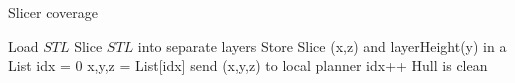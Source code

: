 \begin{algorithm}
	\caption{Slicer coverage} \label{algo:CompCove}
	\begin{small}
	
	
	\begin{algorithmic}[1]
		\State Load $STL$ 
		\State Slice $STL$ into separate layers
		\State Store Slice (x,z) and layerHeight(y) in a List
		\EndFor
		\State idx = 0
		    \State x,y,z = List[idx]
		    \State send (x,y,z) to local planner
		    \State idx++
		\Else
		\State Hull is clean
		\EndIf
	\end{algorithmic}
	\end{small}
\end{algorithm}
